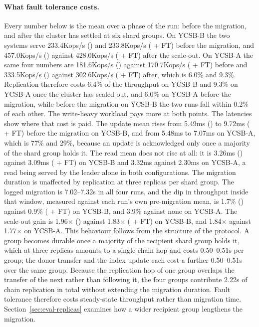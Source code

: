 \paragraph{What fault tolerance costs.}
Every number below is the mean over a phase of the run: before the migration, and after
the cluster has settled at six shard groups.
On YCSB-B the two systems serve 233.4Kops/s (\OurImplementation{}) and 233.8Kops/s
(\OurImplementation{} + FT) before the migration, and 457.0Kops/s (\OurImplementation{})
against 428.0Kops/s (\OurImplementation{} + FT) after the scale-out.
On YCSB-A the same four numbers are 181.6Kops/s (\OurImplementation{}) against
170.7Kops/s (\OurImplementation{} + FT) before and 333.5Kops/s (\OurImplementation{})
against 302.6Kops/s (\OurImplementation{} + FT) after, which is 6.0\% and 9.3\%.
Replication therefore costs 6.4\% of the throughput on YCSB-B and 9.3\% on YCSB-A once the
cluster has scaled out, and 6.0\% on YCSB-A before the migration, while before the
migration on YCSB-B the two runs fall within 0.2\% of each other.
The write-heavy workload pays more at both points.
The latencies show where that cost is paid.
The update mean rises from 5.49ms (\OurImplementation{}) to 9.72ms (\OurImplementation{} +
FT) before the migration on YCSB-B, and from 5.48ms to 7.07ms on YCSB-A, which is 77\% and
29\%, because an update is acknowledged only once a majority of the shard group holds it.
The read mean does not rise at all: it is 3.26ms (\OurImplementation{}) against 3.09ms
(\OurImplementation{} + FT) on YCSB-B and 3.32ms against 2.30ms on YCSB-A, a read being
served by the leader alone in both configurations.
The migration duration is unaffected by replication at three replicas per shard group.
The logged migration is 7.02--7.32s in all four runs, and the dip in throughput inside
that window, measured against each run's own pre-migration mean, is 1.7\%
(\OurImplementation{}) against 0.9\% (\OurImplementation{} + FT) on YCSB-B, and 3.9\%
against none on YCSB-A.
The scale-out gain is 1.96$\times$ (\OurImplementation{}) against 1.83$\times$
(\OurImplementation{} + FT) on YCSB-B, and 1.84$\times$ against 1.77$\times$ on YCSB-A.
This behaviour follows from the structure of the protocol.
A group becomes durable once a majority of the recipient shard group holds it, which at
three replicas amounts to a single chain hop and costs 0.50--0.51s per group; the donor
transfer and the index update each cost a further 0.50--0.51s over the same group.
Because the replication hop of one group overlaps the transfer of the next rather than
following it, the four groups contribute 2.22s of chain replication in total without
extending the migration duration.
Fault tolerance therefore costs steady-state throughput rather than migration time.
Section~\ref{sec:eval-replicas} examines how a wider recipient group lengthens the
migration.

